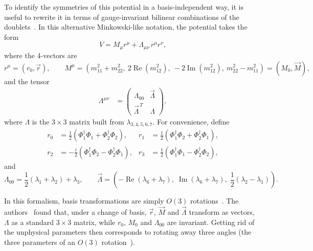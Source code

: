 \documentclass[a4paper, 11pt]{article}
\begin{document}
To identify the symmetries of this potential in a basis-independent way, it is useful to rewrite it in terms of gauge-invariant bilinear combinations of the doublets~\cite{2HDM,bilinear_2HDM}. In this alternative Minkowski-like notation, the potential takes the form
\begin{equation}
    V=M_\mu r^\mu + \Lambda_{\mu\nu}\,r^\mu r^\nu,
    \label{eq:bilinear_potential}
\end{equation}
where the 4-vectors are
\begin{equation*}
    r^\mu = (r_0,\vec{r}),\qquad M^\mu=\left(m_{11}^2+m_{22}^2,\ 2\operatorname{Re}(m_{12}^2),\ -2\operatorname{Im}(m_{12}^2),\ m_{22}^2-m_{11}^2\right)=(M_0,\vec{M}),
\end{equation*}
and the tensor
\begin{align*}
    \Lambda^{\mu\nu}
    &=
    \begin{pmatrix}
        \Lambda_{00} & \vec{\Lambda} \\
        \vec{\Lambda}^{\,T} & \Lambda
    \end{pmatrix},
\end{align*}
where $\Lambda$ is the $3\times 3$ matrix built from $\lambda_{3,4,5,6,7}$. For convenience, define~\cite{2HDM}
\begin{equation}
    \begin{aligned}
        r_0 &= \frac{1}{2}\left(\Phi_1^\dagger \Phi_1 + \Phi_2^\dagger \Phi_2\right),
        &
        r_1 &= \frac{1}{2}\left(\Phi_1^\dagger \Phi_2 + \Phi_2^\dagger \Phi_1\right),
        \\[4pt]
        r_2 &= -\frac{i}{2}\left(\Phi_1^\dagger \Phi_2 - \Phi_2^\dagger \Phi_1\right),
        &
        r_3 &= \frac{1}{2}\left(\Phi_1^\dagger \Phi_1 - \Phi_2^\dagger \Phi_2\right),
    \end{aligned}
    \label{eq:r_01234}
\end{equation}
and
\begin{equation*}
    \Lambda_{00}
    =
    \frac{1}{2}(\lambda_1+\lambda_2)+\lambda_3,\qquad
    \vec{\Lambda}
    =
    \left(
    -\operatorname{Re}(\lambda_6+\lambda_7),\;
    \operatorname{Im}(\lambda_6+\lambda_7),\;
    \frac{1}{2}(\lambda_2-\lambda_1)
    \right).
\end{equation*}

In this formalism, basis transformations are simply $O(3)$ rotations~\cite{2HDM}. The authors~\cite{2HDM} found that, under a change of basis, $\vec{r}$, $\vec{M}$ and $\vec{\Lambda}$ transform as vectors, $\Lambda$ as a standard $3\times3$ matrix, while $r_0$, $M_0$ and $\Lambda_{00}$ are invariant. Getting rid of the unphysical parameters then corresponds to rotating away three angles (the three parameters of an $O(3)$ rotation~\cite{2HDM}).
\end{document}
